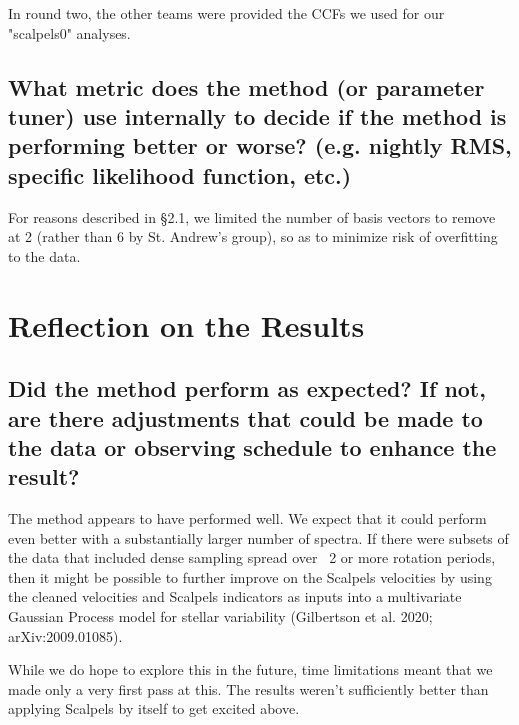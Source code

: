 \documentclass[12pt]{article}
\begin{document}
In round two, the other teams were provided the CCFs we used for our "scalpels0" analyses.


\subsection{What metric does the method (or parameter tuner) use internally to decide if the method is performing better or worse?  (e.g. nightly RMS, specific likelihood function, etc.)}

For reasons described in \S 2.1, we limited the number of basis vectors to remove at 2 (rather than 6 by St. Andrew's group), so as to minimize risk of overfitting to the data.



\section{Reflection on the Results}
\subsection{Did the method perform as expected?  If not, are there adjustments that could be made to the data or observing schedule to enhance the result?}

The method appears to have performed well.  We expect that it could perform even better with a substantially larger number of spectra.
If there were subsets of the data that included dense sampling spread over ~2 or more rotation periods, then it might be possible to further improve on the Scalpels velocities by using the cleaned velocities and Scalpels indicators as inputs into a multivariate Gaussian Process model for stellar variability (Gilbertson et al. 2020; arXiv:2009.01085).

While we do hope to explore this in the future, time limitations meant that we made only a very first pass at this.  The results weren't sufficiently better than applying Scalpels by itself to get excited above.
\end{document}
